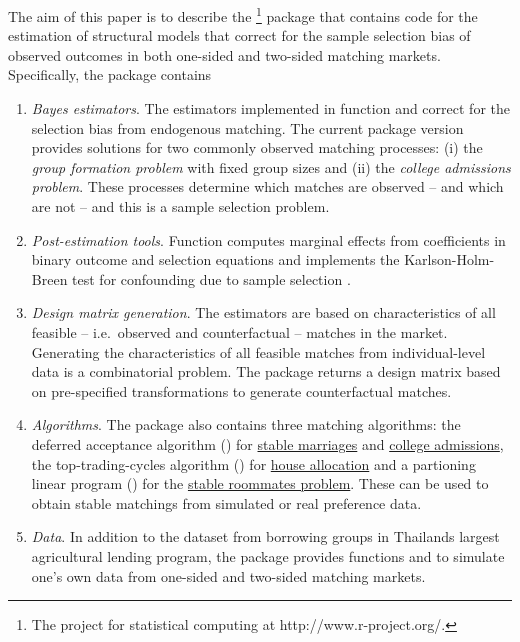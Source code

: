 The aim of this paper is to describe the \footnote{The  project for statistical computing \citep{RCoreTeam2014} at http://www.r-project.org/.} package  \citep{Klein2015b} that contains  code for the estimation of structural models that correct for the sample selection bias of observed outcomes in both one-sided and two-sided matching markets. 
Specifically, the  package contains
\begin{enumerate}
\item \textit{Bayes estimators}. The estimators implemented in function  and  correct for the selection bias from endogenous matching. The current package version provides solutions for two commonly observed matching processes: 
(i) the \textit{group formation problem} with fixed group sizes and
(ii) the \textit{college admissions problem}.
These processes determine which matches are observed -- and which are not -- and this is a sample selection problem.

\item \textit{Post-estimation tools}. Function  computes marginal effects from coefficients in binary outcome and selection equations and  implements the Karlson-Holm-Breen test for confounding due to sample selection \citep{Karlson2012}.

\item \textit{Design matrix generation}. The estimators are based on characteristics of all feasible -- i.e.\ observed and counterfactual -- matches in the market. Generating the characteristics of all feasible matches from individual-level data is a combinatorial problem. The package returns a design matrix based on pre-specified transformations to generate counterfactual matches.

\item \textit{Algorithms}. The package also contains three matching algorithms: the deferred acceptance algorithm () for \href{http://en.wikipedia.org/wiki/Stable_matching}{stable marriages} and \href{http://en.wikipedia.org/wiki/Hospital_resident}{college admissions}, the top-trading-cycles algorithm () for \href{http://en.wikipedia.org/wiki/Herbert_Scarf#8._The_Housing_Market}{house allocation} and a partioning linear program () for the \href{http://en.wikipedia.org/wiki/Stable_roommates_problem}{stable roommates problem}. These can be used to obtain stable matchings from simulated or real preference data. 

\item \textit{Data}. In addition to the  dataset from borrowing groups in Thailands largest agricultural lending program, the package provides functions  and  to simulate one's own data from one-sided and two-sided matching markets. %
\end{enumerate}


